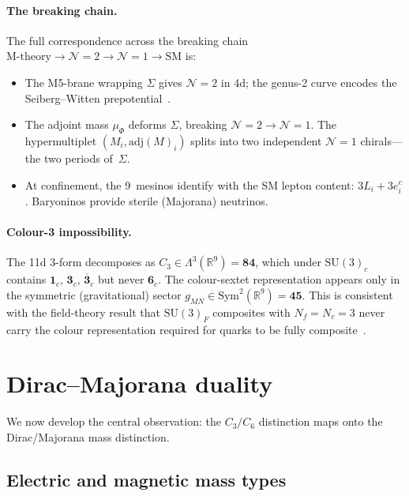 \documentclass[aps,prd,twocolumn,showpacs,preprintnumbers,superscriptaddress,floatfix]{revtex4-2}
\newcommand{\SU}{\mathrm{SU}}
\newcommand{\Nf}{N_{\!f}}
\newcommand{\Nc}{N_{\!c}}
\newcommand{\adj}{\mathrm{adj}}
\begin{document}
\paragraph{The breaking chain.}
The full correspondence across the breaking chain
$\text{M-theory} \to \mathcal{N}{=}2 \to \mathcal{N}{=}1 \to
\text{SM}$ is:
\begin{itemize}
\item The M5-brane wrapping $\Sigma$ gives $\mathcal{N}{=}2$ in
  4d; the genus-2 curve encodes the Seiberg--Witten
  prepotential~\cite{SeibergWitten:1994}.
\item The adjoint mass $\mu_\Phi$ deforms $\Sigma$, breaking
  $\mathcal{N}{=}2 \to \mathcal{N}{=}1$.
  The hypermultiplet $(M_i, \adj(M)_i)$ splits into two
  independent $\mathcal{N}{=}1$ chirals---the two periods
  of~$\Sigma$.
\item At confinement, the 9~mesinos identify with the SM
  lepton content: $3L_i + 3e^c_i$.
  Baryoninos provide sterile (Majorana) neutrinos.
\end{itemize}

\paragraph{Colour-3 impossibility.}
The 11d 3-form decomposes as
$C_3 \in \Lambda^3(\mathbb{R}^9) = \mathbf{84}$, which under
$\SU(3)_c$ contains $\mathbf{1}_c$, $\mathbf{3}_c$,
$\overline{\mathbf{3}}_c$ but never $\mathbf{6}_c$.
The colour-sextet representation appears only in the symmetric
(gravitational) sector
$g_{MN} \in \mathrm{Sym}^2(\mathbb{R}^9) = \mathbf{45}$.
This is consistent with the field-theory result that
$\SU(3)_F$ composites with $\Nf = \Nc = 3$ never carry the
colour representation required for quarks to be fully
composite~\cite{Rivero:2024epjc}.


\section{Dirac--Majorana duality}
\label{sec:duality}

We now develop the central observation: the $C_3/C_6$ distinction
maps onto the Dirac/Majorana mass distinction.

\subsection{Electric and magnetic mass types}
\end{document}
